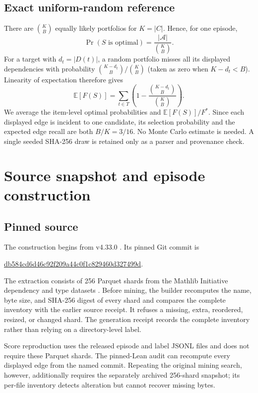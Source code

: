 \subsection{Exact uniform-random reference}

There are $\binom{K}{B}$ equally likely portfolios for $K=|C|$.  Hence, for
one episode,
\[
  \Pr(S\text{ is optimal})=\frac{|\mathcal A|}{\binom{K}{B}}.
\]
For a target with $d_t=|D(t)|$, a random portfolio misses all its displayed
dependencies with probability $\binom{K-d_t}{B}/\binom{K}{B}$ (taken as zero
when $K-d_t<B$).  Linearity of expectation therefore gives
\[
 \mathbb E[F(S)]=\sum_{t\in T}
 \left(1-\frac{\binom{K-d_t}{B}}{\binom{K}{B}}\right).
\]
We average the item-level optimal probabilities and
$\mathbb E[F(S)]/F^*$.  Since each displayed edge is incident to one candidate,
its selection probability and the expected edge recall are both $B/K=3/16$.
No Monte Carlo estimate is needed.  A single seeded SHA-256 draw is retained
only as a parser and provenance check.

\section{Source snapshot and episode construction}

\subsection{Pinned source}

The construction begins from \mathlib{} v4.33.0
\citep{mathlib433commit}.  Its pinned Git commit is
\begin{center}
\small\url{db584cd6d46c92f209a44c0f1c829460d327499d}.
\end{center}
\noindent The extraction consists of 256 Parquet shards from the Mathlib
Initiative dependency and type datasets
\citep{mathlibdeps2026,mathlibtypes2026}.  Before mining, the
builder recomputes the name, byte size,
and SHA-256 digest of every shard and compares the complete inventory with the
earlier source receipt.  It refuses a missing, extra, reordered, resized, or
changed shard.  The generation receipt records the complete inventory rather
than relying on a directory-level label.

Score reproduction uses the released episode and label JSONL files and does
not require these Parquet shards.  The pinned-Lean audit can recompute every
displayed edge from the named \mathlib{} commit.  Repeating the original mining
search, however, additionally requires the separately archived 256-shard
snapshot; its per-file inventory detects alteration but cannot recover missing
bytes.

